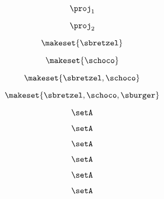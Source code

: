 \begin{forslides}
     \begin{equation}
        \label{eq:combination-154}
        \proj_1
    \end{equation}
    
     \begin{equation}
        \label{eq:combination-155}
        \proj_2
    \end{equation}
    
    \begin{equation}
        \label{eq:combination-156}
        \makeset{ \sbretzel }
    \end{equation}
    
     \begin{equation}
        \label{eq:combination-157}
         \makeset{ \schoco }
    \end{equation}
    
     \begin{equation}
        \label{eq:combination-158}
         \makeset{ \sbretzel, \schoco }
    \end{equation}
    
    \begin{equation}
        \label{eq:combination-159}
        \makeset{ \sbretzel, \schoco, \sburger }
    \end{equation}
    
       \begin{equation}
        \label{eq:combination-160}
        \setA
    \end{equation}
       
     \begin{equation}
        \label{eq:combination-161}
        \setA
    \end{equation}
    
     \begin{equation}
        \label{eq:combination-162}
        \setA
    \end{equation}
    
    \begin{equation}
        \label{eq:combination-163}
        \setA
    \end{equation}
    
     \begin{equation}
        \label{eq:combination-164}
        \setA
    \end{equation}
    
     \begin{equation}
        \label{eq:combination-165}
        \setA
    \end{equation}
    

\end{forslides}
